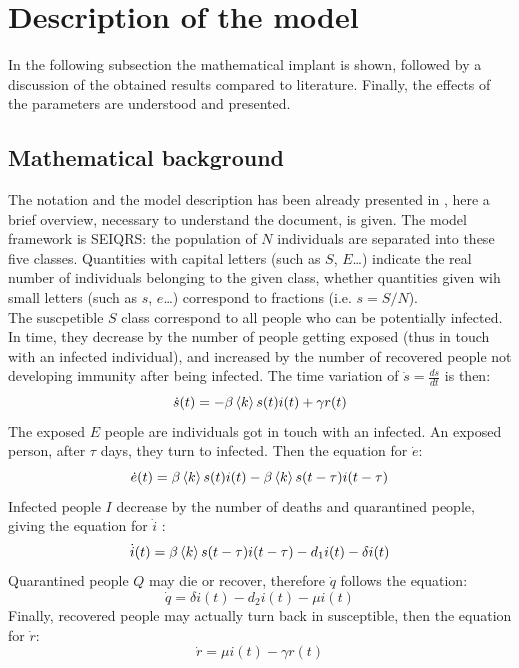 
\section{Description of the model}
\label{sec:model}

In the following subsection the mathematical implant is shown, followed by a discussion of the obtained results compared to literature. Finally, the effects of the parameters are understood and presented.

\subsection{Mathematical background}
\label{ssec:math}
The notation and the model description has been already presented in \cite{MingLiu}, here a brief overview, necessary to understand the document, is given. The model framework is SEIQRS: the population of $N$ individuals are separated into these five classes. Quantities with capital letters (such as $S$, $E$\dots) indicate the real number of individuals belonging to the given class, whether quantities given wih small letters (such as $s$, $e$\dots) correspond to fractions (i.e. $s = S/N$). \\

The suscpetible $S$ class correspond to all people who can be potentially infected. In time, they decrease by the number of people getting exposed (thus in touch with an infected individual), and increased by the number of recovered people not developing immunity after being infected. The time variation of $\dot{s} = \frac{ds}{dt}$ is then:
\begin{equation}
\dot{s} (t)= -\beta\braket{k}s(t)i(t)+\gamma{r(t)} 
\end{equation} 
The exposed $E$ people are individuals got in touch with an infected. An exposed person, after $\tau$ days, they turn to infected. Then the equation for $\dot{e}$:
\begin{equation}
\dot{e} (t)= \beta\braket{k}s(t)i(t) - \beta\braket{k}s(t-\tau)i(t-\tau) 
\end{equation} 
Infected people $I$ decrease by the number of deaths and quarantined people, giving the equation for $\dot{i}$ :
\begin{equation}
\dot{i} (t)= \beta\braket{k}s(t-\tau)i(t-\tau) - d_1i(t) - \delta {i(t)}
\end{equation} 
Quarantined people $Q$ may die or recover, therefore $\dot{q}$ follows the equation:
\begin{equation}
\dot{q} = \delta{i(t)} - d_2{i(t)} - \mu{i(t)}
\end{equation}
Finally, recovered people may actually turn back in susceptible, then the equation for $\dot{r}$:
\begin{equation}
\dot{r} = \mu{i(t)}-\gamma{r(t)}
\end{equation}

